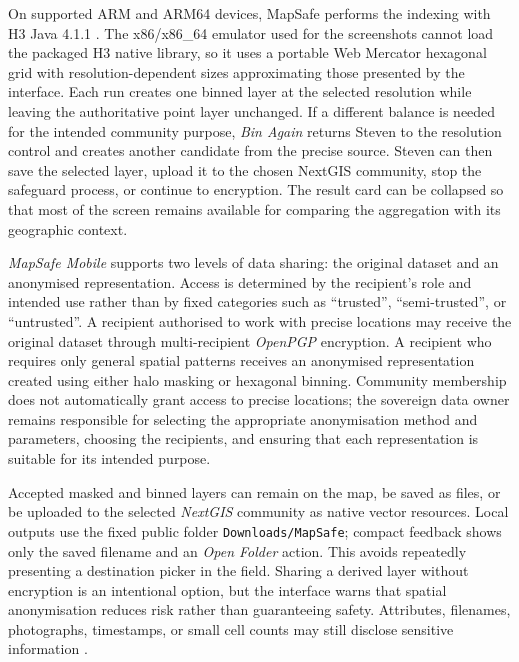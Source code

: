 \documentclass[]{interact}
\begin{document}
On supported ARM and ARM64 devices, MapSafe performs the indexing with H3 Java 4.1.1 \citep{sahr2003geodesic,uber2018h3}. The x86/x86\_64 emulator used for the screenshots cannot load the packaged H3 native library, so it uses a portable Web Mercator hexagonal grid with resolution-dependent sizes approximating those presented by the interface. Each run creates one binned layer at the selected resolution while leaving the authoritative point layer unchanged. If a different balance is needed for the intended community purpose, \emph{Bin Again} returns Steven to the resolution control and creates another candidate from the precise source. Steven can then save the selected layer, upload it to the chosen NextGIS community, stop the safeguard process, or continue to encryption. The result card can be collapsed so that most of the screen remains available for comparing the aggregation with its geographic context.

\textit{MapSafe Mobile} supports two levels of data sharing: the original dataset and an anonymised representation. Access is determined by the recipient’s role and intended use rather than by fixed categories such as ``trusted'', ``semi-trusted'', or ``untrusted''. A recipient authorised to work with precise locations may receive the original dataset through multi-recipient \textit{OpenPGP} encryption. A recipient who requires only general spatial patterns receives an anonymised representation created using either halo masking or hexagonal binning. Community membership does not automatically grant access to precise locations; the sovereign data owner remains responsible for selecting the appropriate anonymisation method and parameters, choosing the recipients, and ensuring that each representation is suitable for its intended purpose.







Accepted masked and binned layers can remain on the map, be saved as files, or be uploaded to the selected \textit{NextGIS} community as native vector resources. Local outputs use the fixed public folder \texttt{Downloads/MapSafe}; compact feedback shows only the saved filename and an \emph{Open Folder} action. This avoids repeatedly presenting a destination picker in the field. Sharing a derived layer without encryption is an intentional option, but the interface warns that spatial anonymisation reduces risk rather than guaranteeing safety. Attributes, filenames, photographs, timestamps, or small cell counts may still disclose sensitive information \citep{kessler2018geoprivacy,cassa2008re,zimmerman2008quantifying}.
\end{document}
